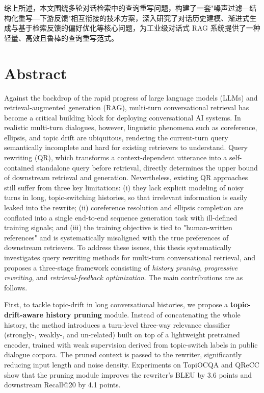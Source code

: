 综上所述，本文围绕多轮对话检索中的查询重写问题，构建了一套"噪声过滤—结构化重写—下游反馈"相互衔接的技术方案，深入研究了对话历史建模、渐进式生成与基于检索反馈的偏好优化等核心问题，为工业级对话式 RAG 系统提供了一种轻量、高效且鲁棒的查询重写范式。


\chapter{Abstract}

Against the backdrop of the rapid progress of large language models (LLMs) and retrieval-augmented generation (RAG), multi-turn conversational retrieval has become a critical building block for deploying conversational AI systems. In realistic multi-turn dialogues, however, linguistic phenomena such as coreference, ellipsis, and topic drift are ubiquitous, rendering the current-turn query semantically incomplete and hard for existing retrievers to understand. Query rewriting (QR), which transforms a context-dependent utterance into a self-contained standalone query before retrieval, directly determines the upper bound of downstream retrieval and generation. Nevertheless, existing QR approaches still suffer from three key limitations: (i) they lack explicit modeling of noisy turns in long, topic-switching histories, so that irrelevant information is easily leaked into the rewrite; (ii) coreference resolution and ellipsis completion are conflated into a single end-to-end sequence generation task with ill-defined training signals; and (iii) the training objective is tied to "human-written references" and is systematically misaligned with the true preferences of downstream retrievers. To address these issues, this thesis systematically investigates query rewriting methods for multi-turn conversational retrieval, and proposes a three-stage framework consisting of \emph{history pruning}, \emph{progressive rewriting}, and \emph{retrieval-feedback optimization}. The main contributions are as follows.

First, to tackle topic-drift in long conversational histories, we propose a \textbf{topic-drift-aware history pruning} module. Instead of concatenating the whole history, the method introduces a turn-level three-way relevance classifier (strongly-, weakly-, and un-related) built on top of a lightweight pretrained encoder, trained with weak supervision derived from topic-switch labels in public dialogue corpora. The pruned context is passed to the rewriter, significantly reducing input length and noise density. Experiments on TopiOCQA and QReCC show that the pruning module improves the rewriter's BLEU by 3.6 points and downstream Recall@20 by 4.1 points.

